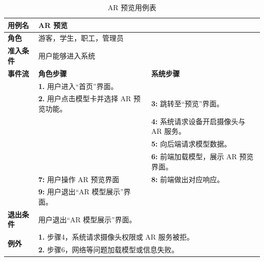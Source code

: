 \begin{table}[H]
  \centering
  \renewcommand\arraystretch{1.1}
  \small
  \caption{AR 预览用例表}
  \setlength{\tabcolsep}{4mm}
  \begin{tabular}{|p{2cm}|p{5.75cm}|p{5.75cm}|}
    \hline \textbf{用例名} & \multicolumn{2}{l|}{AR 预览} \\
    \hline \textbf{角色} & \multicolumn{2}{l|}{游客，学生，职工，管理员} \\
    \hline \textbf{准入条件} & \multicolumn{2}{l|}{用户能够进入系统} \\
    \hline \textbf{事件流} & \textbf{角色步骤} & \textbf{系统步骤} \\
    \hline \multirow{3}{*}{~} & \textbf{1.} 用户进入``首页''界面。  &    \\
    \cline{2-3} & \textbf{2.} 用户点击模型卡并选择 AR 预览功能。 & \textbf{3:} 跳转至``预览''界面。 \\
    \cline{2-3} &  & \textbf{4:} 系统请求设备开启摄像头与 AR 服务。 \\
    \cline{2-3} &  & \textbf{5:} 向后端请求模型数据。 \\
    \cline{2-3} &  & \textbf{6:} 前端加载模型，展示 AR 预览界面。 \\
    \cline{2-3} & \textbf{7:} 用户操作 AR 预览界面 & \textbf{8:} 前端做出对应响应。 \\
    \cline{2-3} & \textbf{9:} 用户退出``AR 模型展示''界面。 &  \\
    \hline \textbf{退出条件}  & \multicolumn{2}{l|}{用户退出``AR 模型展示''界面。} \\
    \hline \multirow{2}{*}{\textbf{例外}} & \multicolumn{2}{l|}{\textbf{1.} 步骤4，系统请求摄像头权限或 AR 服务被拒。} \\
    & \multicolumn{2}{l|}{\textbf{2.} 步骤6，网络等问题加载模型或信息失败。} \\
    \hline
  \end{tabular}
\end{table}


